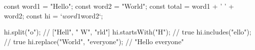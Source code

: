 const word1 = "Hello";
const word2 = "World";
const total = word1 + ' ' + word2;
const hi = `${word1} ${word2}`;

hi.split("o"); // ["Hell", " W", "rld"]
hi.startsWith("H"); // true
hi.includes("ello"); // true
hi.replace("World", "everyone"); // "Hello everyone"